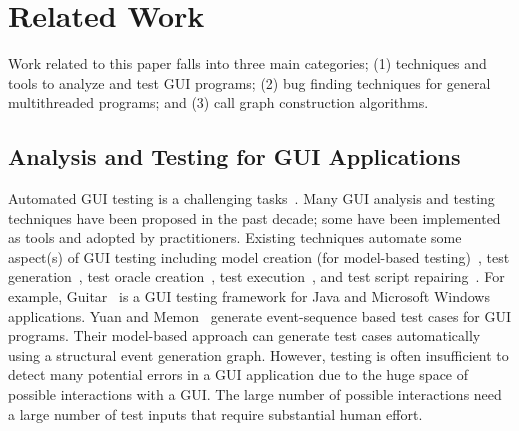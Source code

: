 \section{Related Work}

Work related to this paper falls into three main categories; (1)
techniques and tools to analyze and test GUI programs; (2)
bug finding techniques for general multithreaded programs; and (3)
call graph construction algorithms.

\tinystep
\subsection{Analysis and Testing for GUI Applications}

Automated GUI testing is a challenging tasks~\cite{Bertolino:2007:STR:1253532.1254712,
Harrold:2000:TR:336512.336532}.
 Many GUI analysis and testing techniques have been proposed in the past decade; some have been
implemented as tools and adopted by practitioners. Existing techniques automate
some aspect(s) of GUI testing including model creation
(for model-based testing)~\cite{androidtesting}, %
test generation~\cite{YuanMemonICSE2007},
test oracle creation~\cite{MemonFSE2000}, test execution~\cite{YuanCohenMemonTSE2011},
and test script repairing~\cite{Huang:2010:RGT:1828417.1828465, Daniel:2011:AGR:2002931.2002937}.
For example,
Guitar~\cite{YuanCohenMemonTSE2011, YuanMemonICSE2007}%
is a GUI testing framework for Java and Microsoft Windows applications. 
Yuan and Memon~\cite{YuanMemonICSE2007} generate event-sequence based test cases for GUI
programs. Their model-based approach can generate test cases automatically using a structural event
generation graph. 
However, testing is often insufficient to detect many potential
errors in a GUI application
due to the huge space of possible interactions
with a GUI. The large number of possible interactions
need a large number of test inputs that require substantial human effort.
